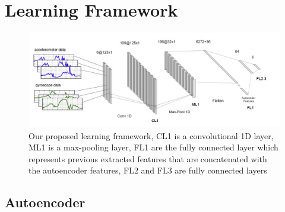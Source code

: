 \section{Learning Framework}
\label{sec:learning-framework}

\begin{figure}[h]
	\centering
	\includegraphics[width=1\textwidth]{images/full_architecture.jpg}
	\caption{Our proposed learning framework, CL1 is a convolutional 1D layer, ML1 is a max-pooling layer, FL1 are the fully connected layer which represents previous extracted features that are concatenated with the autoencoder features, FL2 and FL3 are fully connected layers}
	\label{fig:proposed-architecture}
\end{figure}

\subsection{Autoencoder}
\label{subsec:autoencoder}

